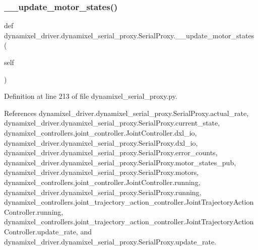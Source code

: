 \mbox{\label{classdynamixel__driver_1_1dynamixel__serial__proxy_1_1_serial_proxy_ab99a3e324c25da6f4e67aa7618bbcab1}} 
\subsubsection{\texorpdfstring{\+\_\+\+\_\+update\+\_\+motor\+\_\+states()}{\_\_update\_motor\_states()}}
{\footnotesize\ttfamily def dynamixel\+\_\+driver.\+dynamixel\+\_\+serial\+\_\+proxy.\+Serial\+Proxy.\+\_\+\+\_\+update\+\_\+motor\+\_\+states (\begin{DoxyParamCaption}\item[{}]{self }\end{DoxyParamCaption})\hspace{0.3cm}{\ttfamily [private]}}



Definition at line 213 of file dynamixel\+\_\+serial\+\_\+proxy.\+py.



References dynamixel\+\_\+driver.\+dynamixel\+\_\+serial\+\_\+proxy.\+Serial\+Proxy.\+actual\+\_\+rate, dynamixel\+\_\+driver.\+dynamixel\+\_\+serial\+\_\+proxy.\+Serial\+Proxy.\+current\+\_\+state, dynamixel\+\_\+controllers.\+joint\+\_\+controller.\+Joint\+Controller.\+dxl\+\_\+io, dynamixel\+\_\+driver.\+dynamixel\+\_\+serial\+\_\+proxy.\+Serial\+Proxy.\+dxl\+\_\+io, dynamixel\+\_\+driver.\+dynamixel\+\_\+serial\+\_\+proxy.\+Serial\+Proxy.\+error\+\_\+counts, dynamixel\+\_\+driver.\+dynamixel\+\_\+serial\+\_\+proxy.\+Serial\+Proxy.\+motor\+\_\+states\+\_\+pub, dynamixel\+\_\+driver.\+dynamixel\+\_\+serial\+\_\+proxy.\+Serial\+Proxy.\+motors, dynamixel\+\_\+controllers.\+joint\+\_\+controller.\+Joint\+Controller.\+running, dynamixel\+\_\+driver.\+dynamixel\+\_\+serial\+\_\+proxy.\+Serial\+Proxy.\+running, dynamixel\+\_\+controllers.\+joint\+\_\+trajectory\+\_\+action\+\_\+controller.\+Joint\+Trajectory\+Action\+Controller.\+running, dynamixel\+\_\+controllers.\+joint\+\_\+trajectory\+\_\+action\+\_\+controller.\+Joint\+Trajectory\+Action\+Controller.\+update\+\_\+rate, and dynamixel\+\_\+driver.\+dynamixel\+\_\+serial\+\_\+proxy.\+Serial\+Proxy.\+update\+\_\+rate.


